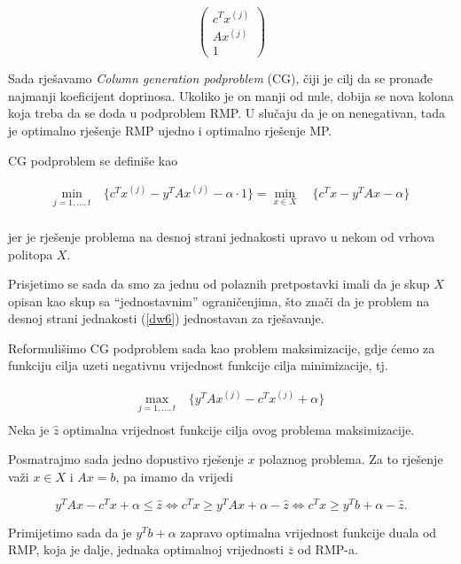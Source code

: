 \documentclass[a4paper, utf8, 11pt, colorlinks]{book}
\theoremstyle{definition}
\begin{document}
 $$\left(\begin{array}{c}
 	c^T x^{(j)}\\
 	A x^{(j)} \\
 	1 
 \end{array}\right)$$
 
 Sada rješavamo \emph{Column generation podproblem} (CG), čiji je cilj da se pronađe najmanji koeficijent doprinosa. Ukoliko je on manji od nule, dobija se nova kolona koja treba da se doda u podproblem RMP.  U slučaju da je on nenegativan, tada je optimalno rješenje RMP ujedno i optimalno rješenje MP.
 
 CG podproblem se definiše kao
 
      \begin{equation}
 	\begin{aligned}\label{dw6}
 		\min_{j=1,\ldots,t}\  & \{c^T x^{(j)} -y^T	Ax^{(j)}-\alpha\cdot 1\}=\min_{x\in X}\  & \{c^Tx-y^T	Ax-\alpha\}\\
 	\end{aligned}
 \end{equation}
 
jer je rješenje problema na desnoj strani jednakosti upravo u nekom od vrhova politopa $X$.

Prisjetimo se sada da smo za jednu od polaznih pretpostavki imali da je skup $X$ opisan kao skup sa ``jednostavnim'' ograničenjima, što znači da je problem na desnoj strani jednakosti (\ref{dw6}) jednostavan za rješavanje.

Reformulišimo  CG podproblem sada kao problem maksimizacije, gdje ćemo za funkciju cilja uzeti negativnu vrijednost funkcije cilja minimizacije, tj.
 
 
       \begin{equation}
 	\begin{aligned}\label{dw7}
 		\max_{j=1,\ldots,t}\  &  \{y^T	Ax^{(j)}-c^Tx^{(j)}+\alpha\}\\
 	\end{aligned}
 \end{equation}
Neka je $\hat{z}$ optimalna vrijednost funkcije cilja ovog problema maksimizacije.

Posmatrajmo sada jedno dopustivo rješenje $x$ polaznog problema. Za to rješenje važi 
$x\in X$ i $Ax=b$, pa imamo da vrijedi %
 
 $$y^T	Ax-c^Tx+\alpha\leqslant \hat{z} \Leftrightarrow c^Tx\geqslant y^T	Ax+\alpha-\hat{z} \Leftrightarrow  c^T x \geqslant y^T b+\alpha-\hat{z}.$$
 
 Primijetimo sada da je  $y^T b+\alpha$ zapravo  optimalna vrijednost funkcije duala od RMP, koja je dalje, jednaka optimalnoj vrijednosti $\overline{z}$ od RMP-a. 
 
\end{document}
